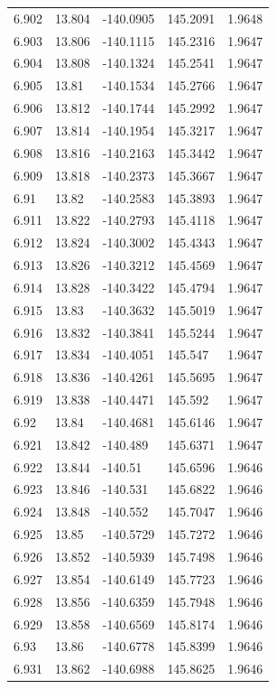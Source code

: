 \begin{tabular}{lllll}
6.902 & 13.804 & -140.0905 & 145.2091 & 1.9648 \\
6.903 & 13.806 & -140.1115 & 145.2316 & 1.9647 \\
6.904 & 13.808 & -140.1324 & 145.2541 & 1.9647 \\
6.905 & 13.81 & -140.1534 & 145.2766 & 1.9647 \\
6.906 & 13.812 & -140.1744 & 145.2992 & 1.9647 \\
6.907 & 13.814 & -140.1954 & 145.3217 & 1.9647 \\
6.908 & 13.816 & -140.2163 & 145.3442 & 1.9647 \\
6.909 & 13.818 & -140.2373 & 145.3667 & 1.9647 \\
6.91 & 13.82 & -140.2583 & 145.3893 & 1.9647 \\
6.911 & 13.822 & -140.2793 & 145.4118 & 1.9647 \\
6.912 & 13.824 & -140.3002 & 145.4343 & 1.9647 \\
6.913 & 13.826 & -140.3212 & 145.4569 & 1.9647 \\
6.914 & 13.828 & -140.3422 & 145.4794 & 1.9647 \\
6.915 & 13.83 & -140.3632 & 145.5019 & 1.9647 \\
6.916 & 13.832 & -140.3841 & 145.5244 & 1.9647 \\
6.917 & 13.834 & -140.4051 & 145.547 & 1.9647 \\
6.918 & 13.836 & -140.4261 & 145.5695 & 1.9647 \\
6.919 & 13.838 & -140.4471 & 145.592 & 1.9647 \\
6.92 & 13.84 & -140.4681 & 145.6146 & 1.9647 \\
6.921 & 13.842 & -140.489 & 145.6371 & 1.9647 \\
6.922 & 13.844 & -140.51 & 145.6596 & 1.9646 \\
6.923 & 13.846 & -140.531 & 145.6822 & 1.9646 \\
6.924 & 13.848 & -140.552 & 145.7047 & 1.9646 \\
6.925 & 13.85 & -140.5729 & 145.7272 & 1.9646 \\
6.926 & 13.852 & -140.5939 & 145.7498 & 1.9646 \\
6.927 & 13.854 & -140.6149 & 145.7723 & 1.9646 \\
6.928 & 13.856 & -140.6359 & 145.7948 & 1.9646 \\
6.929 & 13.858 & -140.6569 & 145.8174 & 1.9646 \\
6.93 & 13.86 & -140.6778 & 145.8399 & 1.9646 \\
6.931 & 13.862 & -140.6988 & 145.8625 & 1.9646 \\

\end{tabular}
